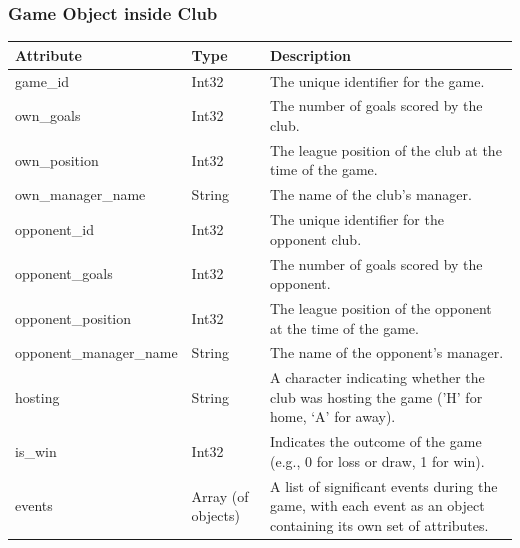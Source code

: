 \documentclass{Configuration_Files/PoliMi3i_thesis}
\begin{document}
\subsubsection{Game Object inside Club}
    \begin{tabular}{|l|l|p{8cm}|}
    \hline
    \textbf{Attribute}            & \textbf{Type}           & \textbf{Description}                                                                                  \\ \hline
    game\_id                      & Int32                   & The unique identifier for the game.                                                                   \\ \hline
    own\_goals                    & Int32                   & The number of goals scored by the club.                                                               \\ \hline
    own\_position                 & Int32                   & The league position of the club at the time of the game.                                              \\ \hline
    own\_manager\_name            & String                  & The name of the club's manager.                                                                       \\ \hline
    opponent\_id                  & Int32                   & The unique identifier for the opponent club.                                                          \\ \hline
    opponent\_goals               & Int32                   & The number of goals scored by the opponent.                                                           \\ \hline
    opponent\_position            & Int32                   & The league position of the opponent at the time of the game.                                          \\ \hline
    opponent\_manager\_name       & String                  & The name of the opponent's manager.                                                                   \\ \hline
    hosting                       & String                  & A character indicating whether the club was hosting the game ('H' for home, ‘A’ for away).             \\ \hline
    is\_win                       & Int32                   & Indicates the outcome of the game (e.g., 0 for loss or draw, 1 for win).                              \\ \hline
    events                        & Array (of objects)      & A list of significant events during the game, with each event as an object containing its own set of attributes. \\ \hline
    \end{tabular}
\end{document}
